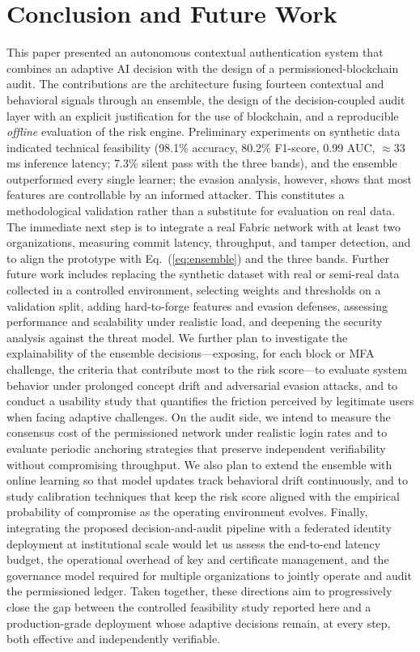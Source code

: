 \documentclass[conference]{IEEEtran}
\begin{document}
\section{Conclusion and Future Work}
\label{sec:conclusion}
This paper presented an autonomous contextual authentication system
that combines an adaptive AI decision with the design of a
permissioned-blockchain audit. The contributions are the architecture
fusing fourteen contextual and behavioral signals through an ensemble,
the design of the decision-coupled audit layer with an explicit
justification for the use of blockchain, and a reproducible
\emph{offline} evaluation of the risk engine. Preliminary experiments on
synthetic data indicated technical feasibility (98.1\% accuracy, 80.2\%
F1-score, 0.99 AUC, $\approx$33\,ms inference latency; 7.3\% silent pass
with the three bands), and the ensemble outperformed every single learner;
the evasion analysis, however, shows that most features are controllable
by an informed attacker. This constitutes a methodological validation rather than a substitute for evaluation on
real data. The immediate next step is to integrate a real Fabric
network with at least two organizations, measuring commit latency,
throughput, and tamper detection, and to align the prototype with
Eq.~(\ref{eq:ensemble}) and the three bands. Further future work includes replacing the synthetic dataset with
real or semi-real data collected in a controlled environment, selecting
weights and thresholds on a validation split, adding hard-to-forge
features and evasion defenses, assessing performance and scalability
under realistic load, and deepening the security analysis against the
threat model. We further plan to investigate the explainability of the
ensemble decisions---exposing, for each block or MFA challenge, the
criteria that contribute most to the risk score---to evaluate system
behavior under prolonged concept drift and adversarial evasion attacks,
and to conduct a usability study that quantifies the friction perceived
by legitimate users when facing adaptive challenges. On the audit side,
we intend to measure the consensus cost of the permissioned network
under realistic login rates and to evaluate periodic anchoring
strategies that preserve independent verifiability without compromising
throughput. We also plan to extend the ensemble with online learning so
that model updates track behavioral drift continuously, and to study calibration techniques
that keep the risk score aligned with the empirical probability of
compromise as the operating environment evolves. Finally, integrating
the proposed decision-and-audit pipeline with a federated identity
deployment at institutional scale would let us assess the end-to-end
latency budget, the operational overhead of key and certificate
management, and the governance model required for multiple organizations
to jointly operate and audit the permissioned ledger. Taken together,
these directions aim to progressively close the gap between the
controlled feasibility study reported here and a production-grade
deployment whose adaptive decisions remain, at every step, both
effective and independently verifiable.
\end{document}
